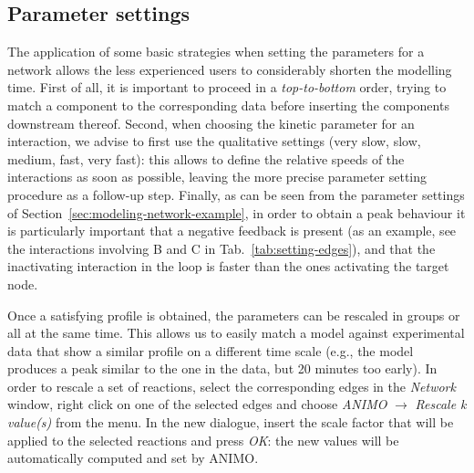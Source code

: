 \documentclass{article}
\def\tas{Timed Automata}
\begin{document}
\subsection{Parameter settings}
The application of some basic strategies when setting the parameters for a network allows
the less experienced users to considerably shorten the modelling time.
First of all, it is important to proceed in a \emph{top-to-bottom} order, trying to match
a component to the corresponding data before inserting the components downstream thereof.
Second, when choosing the kinetic parameter for an interaction, we advise to first use the qualitative settings (very slow, slow, medium, fast, very fast):
this allows to define the relative speeds of the interactions as soon as possible,
leaving the more precise parameter setting procedure as a follow-up step. Finally, as can be seen from
the parameter settings of Section~\ref{sec:modeling-network-example}, in order to obtain a peak
behaviour it is particularly important that
a negative feedback is present (as an example, see the interactions involving B and C in Tab.~\ref{tab:setting-edges}),
and that the inactivating interaction in the loop is faster than the ones activating the target node.

Once a satisfying profile is obtained, the parameters can be rescaled in groups or all at the same time.
This allows us to easily match a model against experimental data that show a similar profile on a different
time scale (e.g., the model produces a peak similar to the one in the data, but 20 minutes too early).
In order to rescale a set of reactions, select the corresponding edges in the \emph{Network} window,
right click on one of the selected edges and choose \emph{ANIMO} $\rightarrow$ \emph{Rescale k value(s)}
from the menu. In the new dialogue, insert the scale factor that will be applied to the selected reactions and
press \emph{OK}: the new values will be automatically computed and set by ANIMO.

\end{document}
